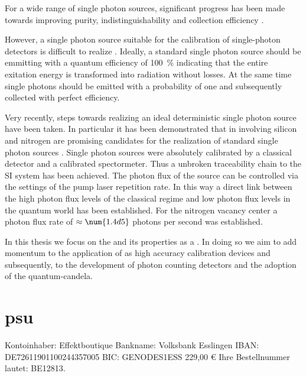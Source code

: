 		For a wide range of single photon sources, significant progress has been made towards improving purity, indistinguishability and collection efficiency \cite{Vaigu2017::21, Vaigu2017::22, Vaigu2017::23, Vaigu2017::24, Vaigu2017::25}.

		However, a single photon source suitable for the calibration of single-photon detectors is difficult to realize \cite{Vaigu2017::paper}. Ideally, a standard single photon source should be emmitting with a quantum efficiency of \SI{100}{\percent} indicating that the entire exitation energy is transformed into radiation without losses. At the same time single photons should be emitted with a probability of one and subsequently collected with perfect efficiency.

		Very recently, steps towards realizing an ideal deterministic single photon source have been taken. In particular it has been demonstrated that \ccs in \nds involving silicon \cite{Rodiek2017::12, Rodiek2017::13} and nitrogen \cite{Rodiek2017::8} are promising candidates for the realization of standard single photon sources \cite{Rodiek2017,Vaigu2017}. Single photon sources were absolutely calibrated by a classical detector and a calibrated spectormeter. Thus a unbroken traceability chain to the SI system has been achieved. The photon flux of the source can be controlled via the settings of the pump laser repetition rate. In this way a direct link between the high photon flux levels of the classical regime and low photon flux levels in the quantum world has been established. For the nitrogen vacancy center a photon flux rate of $\approx \num{1.4d5}$ photons per second was established.

		In this thesis we focus on the \sivc and its properties as a \sps. In doing so we aim to add momentum to the application of \sps as high accuracy calibration devices and subsequently, to the development of photon counting detectors and the adoption of the quantum-candela.


		\section{psu}

			Kontoinhaber: 	Effektboutique
			Bankname: 	Volksbank Esslingen
			IBAN: 	DE72611901100244357005
			BIC: 	GENODES1ESS
			229,00 €
			Ihre Bestellnummer lautet: BE12813.
